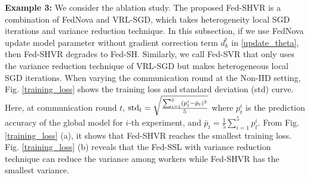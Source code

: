 \documentclass[twoside,journal]{IEEEtran}
\begin{document}
\begin{figure*}[t]
\centering
{}%
\hspace{-2.1cm}
%
\vspace{-0.2cm}
\centering
\caption{Comparison of proposed algorithms Fed-SVHR, Fed-SH, Fed-SVR in terms of training loss and standard deviation on Non-IID case.}
\label{training_loss}
\end{figure*}

\textbf{Example 3:} We consider the ablation study. The proposed Fed-SHVR is a combination of FedNova and VRL-SGD, which  takes heterogeneity local SGD iterations and variance reduction technique. In this subsection, if we use FedNova update model parameter without gradient correction term $d_k^t$ in \eqref{update_theta}, then Fed-SHVR degrades to Fed-SH. Similarly, we call Fed-SVR that only uses the variance reduction technique of VRL-SGD but makes heterogeneous local SGD iterations. When varying the communication round at the Non-IID setting, Fig. \ref{training_loss} shows the training loss and standard deviation (std) curve. Here, at communication round $t$,
$
 {\rm std}_t=\sqrt{\frac{\sum_{i=1}^5(p_t^i-\bar{p}_t)^2}{5}}
$
 where $p_t^i$ is the prediction accuracy of the global model for $i$-th experiment, and $\bar{p}_t=\frac{1}{5}\sum_{i=1}^5p_t^i$. From Fig. \ref{training_loss} (a), it shows that Fed-SHVR reaches the smallest training loss. Fig. \ref{training_loss} (b) reveals that the Fed-SSL with variance reduction technique can reduce the variance among workers while Fed-SHVR has the smallest variance.
\end{document}
